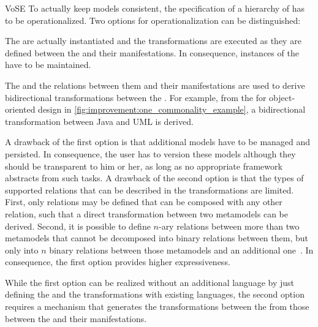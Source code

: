 \begin{copiedFrom}{VoSE}
To actually keep models consistent, the specification of a hierarchy of \conceptmetamodels has to be operationalized.
Two options for operationalization can be distinguished:

\begin{description}[leftmargin=\parindent]
    \item[\Conceptmetamodels as additional metamodels:] The \conceptmetamodels are actually instantiated and the transformations are executed as they are defined between the \conceptmetamodels and their manifestations. In consequence, instances of the \conceptmetamodels have to be maintained.
    \item[Transformations between \concretemetamodels:] The \conceptmetamodels and the relations between them and their manifestations are used to derive bidirectional transformations between the \concretemetamodels. For example, from the \conceptmetamodel for object-oriented design in \autoref{fig:improvement:one_commonality_example}, a bidirectional transformation between Java and UML is derived.
\end{description}

A drawback of the first option is that additional models have to be managed and persisted. 
In consequence, the user has to version these models although they should be transparent to him or her, as long as no appropriate framework abstracts from such tasks.
A drawback of the second option is that the types of supported relations that can be described in the transformations are limited.
First, only relations may be defined that can be composed with any other relation, such that a direct transformation between two metamodels can be derived.
Second, it is possible to define $n$-ary relations between more than two metamodels that cannot be decomposed into binary relations between them, but only into $n$ binary relations between those metamodels and an additional one~\cite{stevens2020BidirectionalTransformationLarge-SoSym}.
In consequence, the first option provides higher expressiveness.

While the first option can be realized without an additional language by just defining the \conceptmetamodels and the transformations with existing languages, the second option requires a mechanism that generates the transformations between the \concretemetamodels from those between the \conceptmetamodels and their manifestations.

\end{copiedFrom} %